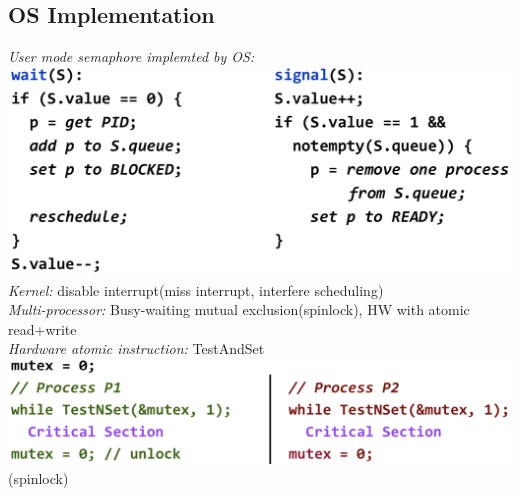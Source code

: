 \subsection *{OS Implementation}
\emph{User mode semaphore implemted by OS:}\\
\includegraphics[width=0.75\linewidth]{images/user-semaphore}\\
\emph{Kernel:} disable interrupt(miss interrupt, interfere scheduling)\\
\emph{Multi-processor:} Busy-waiting mutual exclusion(spinlock), HW with atomic read+write\\
\emph{Hardware atomic instruction:} TestAndSet\\
\includegraphics[width=0.7\linewidth]{images/test-and-set} (spinlock)